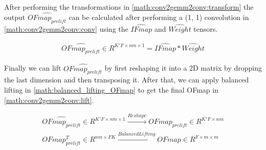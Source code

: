 After performing the transformations in \autoref{math:conv2gemm2conv:transform}
the output $\hat{OFmap_{prelift}}$ can be calculated after performing a (1, 1)
convolution in \autoref{math:conv2gemm2conv:conv} using the $\hat{IFmap}$ and
$\hat{Weight}$ tensors. 

\begin{equation}
    \begin{aligned}
        \hat{OFmap_{prelift}} \in R^{K'F\times nm \times 1} = \hat{IFmap}*\hat{Weight}
        \end{aligned}
    \label{math:conv2gemm2conv:conv}
\end{equation}

Finally we can lift $\hat{OFmap_{prelift}}$ by first reshaping it into a 2D
matrix by dropping the last dimension and then transposing it. After that, we
can apply balanced lifting in \autoref{math:balanced_lifting_OFmap} to get the
final OFmap in \autoref{math:conv2gemm2conv:lift}.

\begin{equation}
    \begin{aligned}
        \hat{OFmap_{prelift}} \in R^{K'F \times nm \times 1} \xrightarrow[]{Reshape} OFmap_{prelift} \in R^{K'F\times nm} \\
        OFmap_{prelift}^T \in R^{nm\times FK} \xrightarrow[]{Balanced Lifting} OFmap \in R^{F \times m \times m} \\
            \end{aligned}
    \label{math:conv2gemm2conv:lift}
\end{equation}

